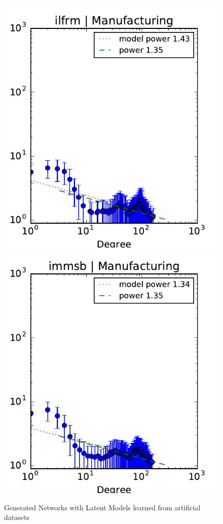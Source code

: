 \begin{figure}[h]
	\endminipage
	\vspace{-0.4cm}
	\includegraphics[scale=0.4]{img/ilfrm_manufacturing_d}
	\endminipage
	\includegraphics[scale=0.4]{img/immsb_manufacturing_d}
	\endminipage
	
	\caption{Generated Networks with Latent Models learned from artificial datasets}
	\label{fig:gen_graph_r}
\end{figure}



